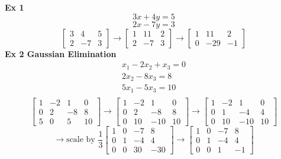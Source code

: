 \documentclass{article}
\begin{document}
  \textbf{Ex 1}
  \[
    3x+4y=5
  \]
  \[
    2x-7y=3
  \]
  \[
    \begin{bmatrix}
      3 &4 & 5\\
      2 &-7 & 3
    \end{bmatrix} \to
    \begin{bmatrix}
      1 &11 & 2\\
      2 &-7 & 3
    \end{bmatrix}
   \to 
    \begin{bmatrix}
      1 & 11 & 2\\
      0 &-29 &-1
    \end{bmatrix}
  \]
  \textbf{Ex 2 Gaussian Elimination}
  \[
    \begin{aligned}
      x_1-2x_2+x_3=0\\
      2x_2-8x_3=8\\
      5x_1-5x_3=10\\
    \end{aligned}
  \]
  \[
    \begin{bmatrix}
    1 & -2 & 1 & 0\\
    0 & 2 & -8 & 8\\
    5 &0 & 5 & 10
    \end{bmatrix}
    \to
    \begin{bmatrix}
      1 &-2 & 1 & 0\\
      0 &2 & -8 & 8\\
      0 &10 & -10 & 10
    \end{bmatrix}
    \to 
    \begin{bmatrix}
      1 & -2 &1 &0\\
      0 &1 & -4 &4\\
      0 &10 & -10 & 10
    \end{bmatrix}
  \]
  \[
    \to \text{scale by } \frac{1}{3}
    \begin{bmatrix}
      1 &0 &-7 & 8\\
      0 &1 & -4 &4\\
      0 &0 &30 &-30
    \end{bmatrix} \to
    \begin{bmatrix}
      1 &0 &-7 & 8\\
      0 &1 &-4 &4\\
      0 &0 &1 &-1
    \end{bmatrix}
  \]
  
  

   
\end{document}

